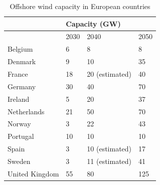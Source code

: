 \documentclass[sn-mathphys,Numbered]{sn-jnl}%
\theoremstyle{thmstyleone}%
\theoremstyle{thmstyletwo}%
\theoremstyle{thmstylethree}%
\begin{document}
\begin{table}[]
\centering
\caption{Offshore wind capacity in European countries}
\label{tab owf capacity}
\begin{tabular}{llll}
\hline
               & \multicolumn{3}{l}{Capacity   (GW)} \\ \hline
               & 2030       & 2040       & 2050      \\ \hline
Belgium        & 6 \cite{NSOG}       & 8 \cite{NSOG}         & 8 \cite{NSOG}         \\
Denmark        & 9 \cite{Offshorewindfarmstenderedtowards2030}          & 10 \cite{EnergyIslandintheNorthSea}        & 35 \cite{NSOG}       \\
France         & 18 \cite{FrancepassesRenewable}        & 20 (estimated)         & 40 \cite{Francecommitsto40}       \\
Germany        & 30 \cite{Morewindenergyatsea}        & 40 \cite{Morewindenergyatsea}        & 70 \cite{Morewindenergyatsea}       \\
Ireland        & 5 \cite{FutureFrameworkforOffshoreRenewableEnergy}         & 20 \cite{FutureFrameworkforOffshoreRenewableEnergy}        & 37 \cite{FutureFrameworkforOffshoreRenewableEnergy}       \\
Netherlands    & 21 \cite{Offshorewindenergy}       & 50 \cite{NetherlandsSets70GW}        & 70 \cite{NetherlandsSets70GW}        \\
Norway         & 3  \cite{300GWNorthSea}        & 22 \cite{ENERGYTRANSITIONNORWAY2023}        & 43 \cite{ENERGYTRANSITIONNORWAY2023}       \\
Portugal       & 10 \cite{Portugaltolaunch}        & 10 \cite{Atlantic}        & 10 \cite{Atlantic}       \\
Spain          & 3  \cite{Spainissuesplan}        & 10 (estimated)          & 17 \cite{Spainrepresents}        \\
Sweden         & 3  \cite{FinlandDenmarkSweden}        & 11 (estimated) \cite{Roadmap2040}         & 41 \cite{Offshorewinddevelopment}       \\
United Kingdom & 55  \cite{Offshorewindnetzero}       & 80 \cite{Offshorewindnetzero}        & 125 \cite{Offshorewindnetzero}      \\ \hline
\end{tabular}
\end{table}
\end{document}
